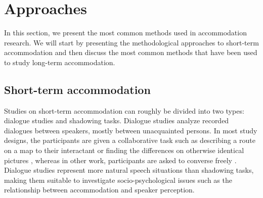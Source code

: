 \documentclass[output=paper,
modfonts
]{langscibook}
\begin{document}
\section{Approaches}
% 
% 
% 
%

In this section, we present the most common methods used in accommodation research. We will start by presenting the methodological approaches to short-term accommodation and then discuss the most common methods that have been used to study long-term accommodation.
% 
% 

\subsection{Short-term accommodation}
Studies on short-term accommodation can roughly be divided into two types: dialogue studies and shadowing tasks. Dialogue studies analyze recorded dialogues between speakers, mostly between unacquainted persons. In most study designs, the participants are given a collaborative task such as describing a route on a map to their interactant \citep[i.e. map task, e.g.][]{pardo_phonetic_2006} or finding the differences on otherwise identical pictures \citep[i.e. diapix task, e.g.][]{kim_phonetic_2013}, whereas in other work, participants are asked to converse freely \citep[e.g.][]{schweitzer_convergence_2013}. Dialogue studies represent more natural speech situations than shadowing tasks, making them suitable to investigate socio-psychological issues such as the relationship between accommodation and speaker perception.
% 
% 
% 
%
\end{document}
